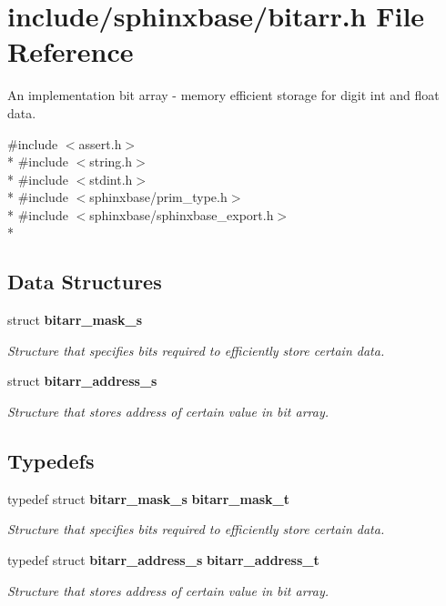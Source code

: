 \section{include/sphinxbase/bitarr.h File Reference}
\label{bitarr_8h}


An implementation bit array -\/ memory efficient storage for digit int and float data.  


{\ttfamily \#include $<$assert.\+h$>$}\\*
{\ttfamily \#include $<$string.\+h$>$}\\*
{\ttfamily \#include $<$stdint.\+h$>$}\\*
{\ttfamily \#include $<$sphinxbase/prim\+\_\+type.\+h$>$}\\*
{\ttfamily \#include $<$sphinxbase/sphinxbase\+\_\+export.\+h$>$}\\*
\subsection*{Data Structures}
\begin{DoxyCompactItemize}
\item 
struct {\bf bitarr\+\_\+mask\+\_\+s}
\begin{DoxyCompactList}\small\item\em Structure that specifies bits required to efficiently store certain data. \end{DoxyCompactList}\item 
struct {\bf bitarr\+\_\+address\+\_\+s}
\begin{DoxyCompactList}\small\item\em Structure that stores address of certain value in bit array. \end{DoxyCompactList}\end{DoxyCompactItemize}
\subsection*{Typedefs}
\begin{DoxyCompactItemize}
\item 
typedef struct {\bf bitarr\+\_\+mask\+\_\+s} {\bf bitarr\+\_\+mask\+\_\+t}\label{bitarr_8h_abcb7d3674c4b4bbed7af00ddfc07a11f}

\begin{DoxyCompactList}\small\item\em Structure that specifies bits required to efficiently store certain data. \end{DoxyCompactList}\item 
typedef struct {\bf bitarr\+\_\+address\+\_\+s} {\bf bitarr\+\_\+address\+\_\+t}\label{bitarr_8h_a0ec20752a791dac325045da770b3510d}

\begin{DoxyCompactList}\small\item\em Structure that stores address of certain value in bit array. \end{DoxyCompactList}\end{DoxyCompactItemize}
